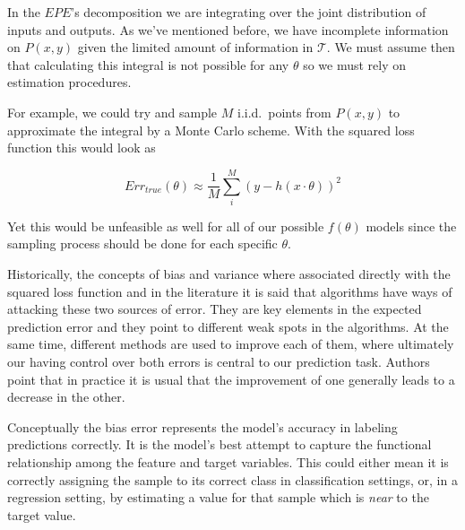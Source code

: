 In the $EPE$'s decomposition we are integrating over the joint distribution of inputs and outputs.
As we've mentioned before, we have incomplete information on $P(x,y)$ given the limited amount of information in $\mathcal{T}$.
We must assume then that calculating this integral is not possible for any $\theta$ so we must rely on estimation procedures.

For example, we could try and sample $M$ i.i.d.\ points from $P(x,y)$ to approximate the integral by a Monte Carlo scheme.
With the squared loss function this would look as

\begin{equation}\label{eq:mcarlo-approx}
Err_{true}(\theta) \approx \frac{1}{M} \sum_i^M {( y - h(x \cdot \theta) )}^2
\end{equation}

Yet this would be unfeasible as well for all of our possible $f( \theta)$ models since the sampling process should be done for each specific $\theta$.

Historically, the concepts of bias and variance where associated directly with the squared loss function and in the literature it is said that algorithms have ways of attacking these two sources of error.
They are key elements in the expected prediction error and they point to different weak spots in the algorithms.
At the same time, different methods are used to improve each of them, where ultimately our having control over both errors is central to our prediction task.
Authors point that in practice it is usual that the improvement of one generally leads to a decrease in the other.

%



Conceptually the bias error represents the model's accuracy in labeling predictions correctly.
It is the model's best attempt to capture the functional relationship among the feature and target variables.
This could either mean it is correctly assigning the sample to its correct class in classification settings, or, in a regression setting, by estimating a value for that sample which is \textit{near} to the target value.

